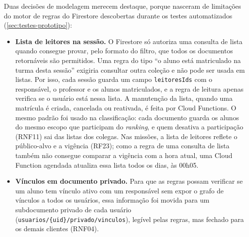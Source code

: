 \begin{figure}[H]
\end{figure}

Duas decisões de modelagem merecem destaque, porque nasceram de
limitações do motor de regras do Firestore descobertas durante os testes
automatizados (\autoref{sec:testes-prototipo}):

\begin{itemize}
  \item \textbf{Lista de leitores na sessão.} O Firestore só autoriza uma
        consulta de lista quando consegue provar, pelo formato do filtro,
        que todos os documentos retornáveis são permitidos. Uma regra do
        tipo ``o aluno está matriculado na turma desta sessão'' exigiria
        consultar outra coleção e não pode ser usada em listas. Por isso,
        cada sessão guarda um campo \texttt{leitoresIds} com o responsável,
        o professor e os alunos matriculados, e a regra de leitura apenas
        verifica se o usuário está nessa lista. A manutenção da lista,
        quando uma matrícula é criada, cancelada ou reativada, é feita por
        Cloud Functions. O mesmo padrão foi usado na classificação: cada
        documento guarda os alunos do mesmo escopo que participam do
        \textit{ranking}, e quem desativa a participação (RNF11) sai das
        listas dos colegas. Nas missões, a lista de leitores reflete o
        público-alvo e a vigência (RF23); como a regra de uma consulta de
        lista também não consegue comparar a vigência com a hora atual,
        uma Cloud Function agendada atualiza essa lista todos os dias, às
        00h05.
  \item \textbf{Vínculos em documento privado.} Para que as regras possam
        verificar se um aluno tem vínculo ativo com um responsável sem
        expor o grafo de vínculos a todos os usuários, essa informação foi
        movida para um subdocumento privado de cada usuário
        (\texttt{usuarios/\{uid\}/privado/vinculos}), legível pelas regras,
        mas fechado para os demais clientes (RNF04).
\end{itemize}

